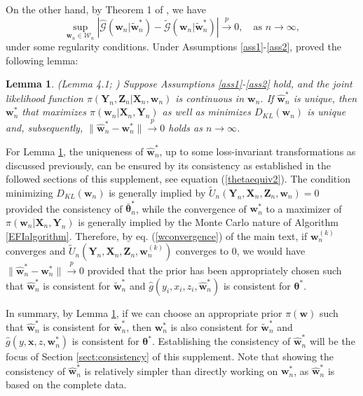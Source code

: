 \documentclass[11pt]{article}
\newcommand{\bX}{{\boldsymbol X}}
\newcommand{\bY}{{\boldsymbol Y}}
\newcommand{\bx}{{\boldsymbol x}}
\newcommand{\bZ}{{\boldsymbol Z}}
\newcommand{\bw}{{\boldsymbol w}}
\newcommand{\mG}{\mathcal{G}}
\newcommand{\btheta}{{\boldsymbol \theta}}
\newtheorem{lemma}{Lemma}[section]
\begin{document}
On the other hand,
by Theorem 1 of \cite{liang2018imputation},  
we have 
 \begin{equation} \label{QQeq}
 \sup_{\bw_n\in \mathcal{W}_n}\left| \widehat{\mG}(\bw_n|\tilde{\bw}_n^*)-\widetilde{\mG}(\bw_n|\tilde{\bw}_n^*) \right| \stackrel{p}{\to} 0, \quad \mbox{as $n\to \infty$},
 \end{equation} 
 under some regularity conditions. Under Assumptions \ref{ass1}-\ref{ass2},
 \cite{LiangKS2024EFI} proved the following lemma: 
  
 \begin{lemma} \label{lemma:equivalent} (Lemma 4.1; \cite{LiangKS2024EFI}) Suppose Assumptions \ref{ass1}-\ref{ass2}   hold, and the joint likelihood function 
 $\pi(\bY_n,\bZ_n|\bX_n,\bw_n)$ is continuous in $\bw_n$. 
 If $\hat{\bw}_n^*$ is unique, then $\bw_n^*$ that 
 maximizes $\pi(\bw_n|\bX_n,\bY_n)$ as well as minimizes 
$D_{KL}(\bw_n)$ is unique and, subsequently, 
$\|\hat{\bw}_n^*-\bw_n^*\| \stackrel{p}{\to} 0$ holds as $n \to \infty$.
 \end{lemma}
 



For Lemma \ref{lemma:equivalent}, 
the uniqueness of $\hat{\bw}_n^*$, up to some loss-invariant transformations as discussed previously, can be ensured by its consistency as established 
in the followed sections of this supplement, see equation (\ref{thetaequiv2}).
The condition minimizing $D_{KL}(\bw_n)$ is generally 
implied by $\tilde{U}_n(\bY_n,\bX_n,\bZ_n,\bw_n)=0$ provided the consistency 
of $\bar{\btheta}_n^*$, while the convergence of $\bw_n^*$ to a maximizer of $\pi(\bw_n|\bX_n,\bY_n)$ is generally implied 
by the Monte Carlo nature of Algorithm \ref{EFIalgorithm}. 
Therefore, by eq. (\ref{wconvergence}) of the main text, if $\bw_n^{(k)}$ converges and 
$\tilde{U}_n(\bY_n,\bX_n,\bZ_n,\bw_n^{(k)})$ converges to 0, we would 
 have $\|\hat{\bw}_n^*-\bw_n^*\| \stackrel{p}{\to} 0$ provided that  
the prior has been appropriately chosen such that 
$\hat{\bw}_n^*$ is consistent for $\tilde{\bw}_n^*$ and $\hat{g}(y_i,x_i,z_i,\hat{\bw}_n^*)$ is consistent for  $\btheta^*$.

In summary, by Lemma \ref{lemma:equivalent}, if we can choose an appropriate prior  $\pi(\bw)$ such that $\hat{\bw}_n^*$  is consistent for $\tilde{\bw}_n^*$, then $\bw_n^*$ is also consistent for $\tilde{\bw}_n^*$
and $\hat{g}(y,\bx,z,\bw_n^*)$ is consistent for $\btheta^*$. 
Establishing the consistency of $\hat{\bw}_n^*$ will be the focus of Section \ref{sect:consistency} of this supplement. 
Note that showing the consistency of $\hat{\bw}_n^*$ is relatively simpler than directly working on $\bw_n^*$, as $\hat{\bw}_n^*$ is based on the complete data. 
 
\end{document}
